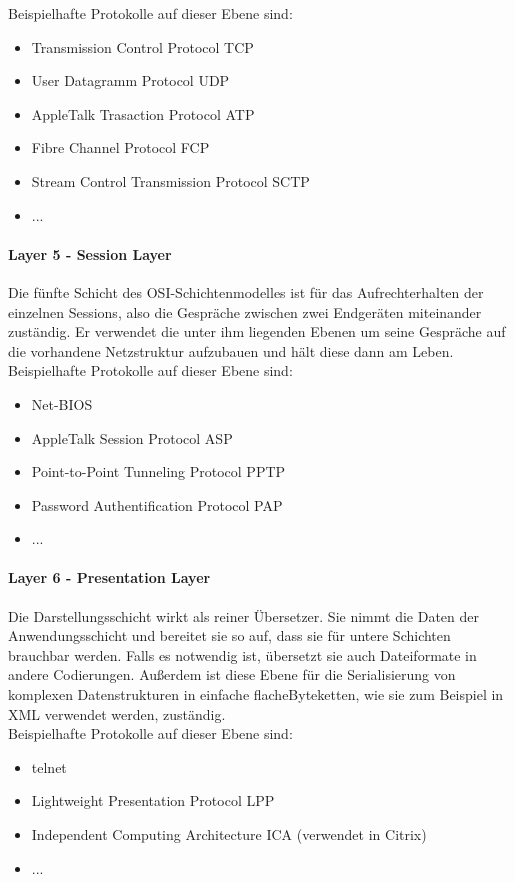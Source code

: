 \documentclass[11pt,a4paper]{report}
\begin{document}
Beispielhafte Protokolle auf dieser Ebene sind:
\begin{itemize}
\item Transmission Control Protocol TCP
\item User Datagramm Protocol UDP
\item AppleTalk Trasaction Protocol ATP
\item Fibre Channel Protocol FCP
\item Stream Control Transmission Protocol SCTP
\item ...
\end{itemize}

\paragraph{Layer 5 - Session Layer}
Die fünfte Schicht des OSI-Schichtenmodelles ist für das Aufrechterhalten der einzelnen Sessions, also die Gespräche zwischen zwei Endgeräten miteinander zuständig. Er verwendet die unter ihm liegenden Ebenen um seine Gespräche auf die vorhandene Netzstruktur aufzubauen und hält diese dann am Leben.\\

Beispielhafte Protokolle auf dieser Ebene sind:
\begin{itemize}
\item Net-BIOS
\item AppleTalk Session Protocol ASP
\item Point-to-Point Tunneling Protocol PPTP
\item Password Authentification Protocol PAP
\item ...
\end{itemize}

\paragraph{Layer 6 - Presentation Layer}
Die Darstellungsschicht wirkt als reiner Übersetzer. Sie nimmt die Daten der Anwendungsschicht und bereitet sie so auf, dass sie für untere Schichten brauchbar werden. Falls es notwendig ist, übersetzt sie auch Dateiformate in andere Codierungen. Außerdem ist diese Ebene für die Serialisierung von komplexen Datenstrukturen in einfache \glqq flache\grqq Byteketten, wie sie zum Beispiel in XML verwendet werden, zuständig.\\

Beispielhafte Protokolle auf dieser Ebene sind:
\begin{itemize}
\item telnet
\item Lightweight Presentation Protocol LPP
\item Independent Computing Architecture ICA (verwendet in Citrix)
\item ...
\end{itemize}
\end{document}
